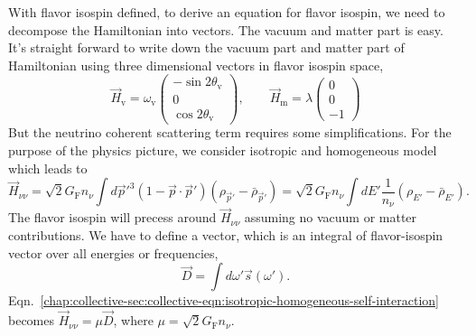 With flavor isospin defined, to derive an equation for flavor isospin, we need to decompose the Hamiltonian into vectors. The vacuum and matter part is easy. It's straight forward to write down the vacuum part and matter part of Hamiltonian using three dimensional vectors in flavor isospin space,
\begin{equation}
   \vec H_{\mathrm v} =  \omega_{\mathrm v}\begin{pmatrix}
   -\sin 2\theta_{\mathrm v}\\
   0 \\
   \cos 2\theta_{\mathrm v}
   \end{pmatrix}, \qquad
   \vec H_{\mathrm m} = \lambda \begin{pmatrix}
   0\\
   0\\
   - 1
   \end{pmatrix}
\end{equation}
But the neutrino coherent scattering term requires some simplifications. For the purpose of the physics picture, we consider isotropic and homogeneous model which leads to
\begin{equation}
   \vec H_{\nu\nu} = \sqrt{2}G_{\mathrm F} n_\nu \int d\vec p'^3 (1-\vec p \cdot \vec p') (\rho_{\vec p'} - \bar\rho_{\vec p'}) = \sqrt{2}G_{\mathrm F} n_\nu \int dE' \frac{1}{n_\nu}(\rho_{E'} - \bar\rho_{E'}).
   \label{chap:collective-sec:collective-eqn:isotropic-homogeneous-self-interaction}
\end{equation}
The flavor isospin will precess around $\vec H_{\nu\nu}$ assuming no vacuum or matter contributions.%
We have to define a vector, which is an integral of flavor-isospin vector over all energies or frequencies,
\begin{equation}
   \vec D = \int d\omega' \vec s(\omega').
\end{equation}
Eqn.~\ref{chap:collective-sec:collective-eqn:isotropic-homogeneous-self-interaction} becomes $\vec H_{\nu\nu} = \mu \vec D$, where $\mu = \sqrt{2}G_{\mathrm F} n_\nu$.



